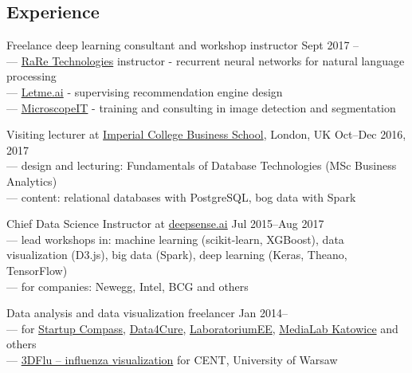 \documentclass[margin,line]{resume}
\begin{document}
\begin{resume}

    \section{\mysidestyle Experience}

    \begin{list2}

    \item Freelance deep learning consultant and workshop instructor \hfill {Sept 2017 --}\\
      --- \href{https://rare-technologies.com/}{RaRe Technologies} instructor - recurrent neural networks for natural language processing\\
      --- \href{https://letme.ai/}{Letme.ai} - supervising recommendation engine design\\
      --- \href{http://www.microscopeit.com/}{MicroscopeIT} - training and consulting in image detection and segmentation

    \item Visiting lecturer at \href{https://wwwf.imperial.ac.uk/business-school/}{Imperial College Business School}, London, UK \hfill Oct--Dec 2016, 2017\\
        --- design and lecturing: Fundamentals of Database Technologies (MSc Business Analytics)\\
        --- content: relational databases with PostgreSQL, bog data with Spark

    \item Chief Data Science Instructor at \href{https://deepsense.ai/}{deepsense.ai} \hfill Jul 2015--Aug 2017\\
        --- lead workshops in: machine learning (scikit-learn, XGBoost), data visualization (D3.js), big data (Spark), deep learning (Keras, Theano, TensorFlow)\\
        --- for companies: Newegg, Intel, BCG and others

    \item Data analysis and data visualization freelancer  \hfill Jan 2014--\\
        --- for \href{http://compass.co}{Startup Compass}, \href{http://www.data4cure.com/}{Data4Cure}, \href{https://laboratorium.ee/en}{LaboratoriumEE}, \href{https://medialabkatowice.eu/en/}{MediaLab Katowice} and others\\
        --- \href{http://nucleus3d.cent.uw.edu.pl/influenza/}{3DFlu -- influenza visualization} for CENT, University of Warsaw


\end{list2}
\end{resume}
\end{document}
